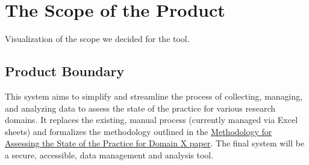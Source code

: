 \documentclass[12pt]{article}
\begin{document}
\section{The Scope of the Product}
Visualization of the scope we decided for the tool.
\subsection{Product Boundary}
This system aims to simplify and streamline the process of collecting, managing, and analyzing data to assess the state of the practice for various research domains. It replaces the existing, manual process (currently managed via Excel sheets) and formalizes the methodology outlined in the \href{https://arxiv.org/abs/2110.11575}{Methodology for Assessing the State of the Practice for Domain X paper}. The final system will be a secure, accessible, data management and analysis tool.
\end{document}
